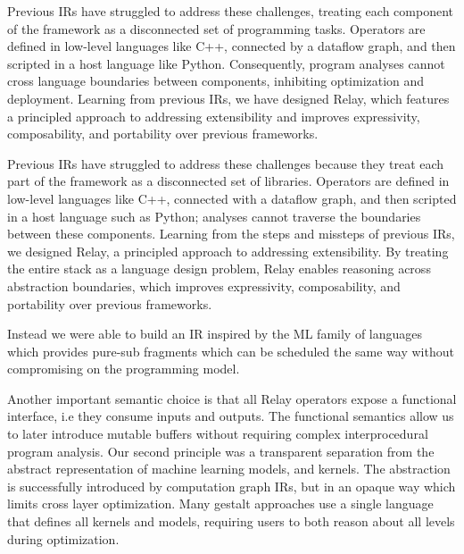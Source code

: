   Previous IRs have struggled to address these challenges, treating each
    component of the framework as a disconnected set of programming tasks.
  Operators are defined in low-level languages like C++,
    connected by a dataflow graph, and then scripted
    in a host language like Python.
  Consequently,
    program analyses cannot cross language boundaries between components,
    inhibiting optimization and deployment.
  Learning from previous IRs, we have designed Relay,
    which features a principled approach to addressing extensibility
    and improves expressivity, composability, and portability
    over previous frameworks.


Previous IRs have struggled to address these challenges because they treat
    each part of the framework as a disconnected set of libraries.
  Operators are defined in low-level languages like C++,
    connected with a dataflow graph, and then scripted
    in a host language such as Python;
    analyses cannot traverse the boundaries between these components.
  Learning from the steps and missteps of previous IRs, we designed Relay,
    a principled approach to addressing extensibility.
  By treating the entire stack as a language
    design problem, Relay enables reasoning across
    abstraction boundaries, which
    improves expressivity, composability, and portability over previous frameworks.

Instead we were able to build an IR inspired by the ML family of languages which provides pure-sub fragments which can be scheduled
  the same way without compromising on the programming model.

Another important semantic choice is that all Relay operators expose a functional interface, i.e they consume inputs and outputs.
The functional semantics allow us to later introduce mutable buffers without requiring complex interprocedural program analysis.
Our second principle was a transparent separation from the abstract representation of machine learning models, and kernels.
The abstraction is successfully introduced by computation graph IRs, but in an opaque way which limits cross layer optimization.
Many gestalt approaches use a single language that defines all kernels and models, requiring users to both reason about all levels during optimization.

